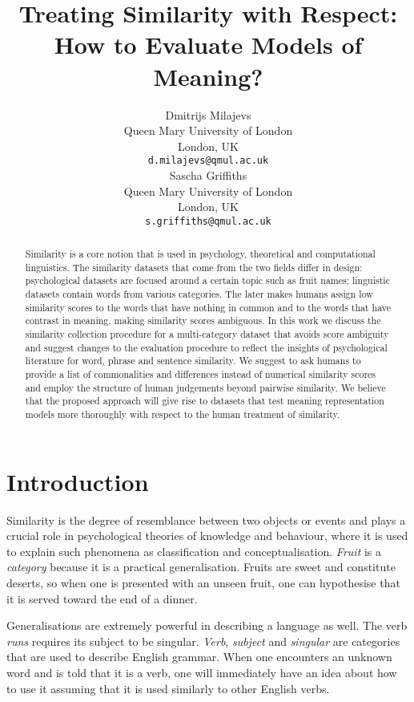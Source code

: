 \documentclass[11pt]{article}
\title{Treating Similarity with Respect: How to Evaluate Models of Meaning?}
\author{Dmitrijs Milajevs \\
  Queen Mary University of London \\
  London, UK \\
  {\tt d.milajevs@qmul.ac.uk} \\\And
  Sascha Griffiths \\
  Queen Mary University of London \\
  London, UK \\
  {\tt s.griffiths@qmul.ac.uk} \\
}
\date{}
\begin{document}
\maketitle

\begin{abstract}
Similarity is a core notion that is used in psychology, theoretical and computational linguistics. The similarity datasets that come from the two fields differ in design: psychological datasets are focused around a certain topic such as fruit names; linguistic datasets contain words from various categories. The later makes humans assign low similarity scores to the words that have nothing in common and to the words that have contrast in meaning, making similarity scores ambiguous. In this work we discuss the similarity collection procedure for a multi-category dataset that avoids score ambiguity and suggest changes to the evaluation procedure to reflect the insights of psychological literature for word, phrase and sentence similarity. We suggest to ask humans to provide a list of commonalities and differences instead of numerical similarity scores and employ the structure of human judgements beyond pairwise similarity. We believe that the proposed approach will give rise to datasets that test meaning representation models more thoroughly with respect to the human treatment of similarity.
\end{abstract}

\section{Introduction}
\label{sec:introduction}

Similarity is the degree of resemblance between two objects or events \cite{WCS:WCS1282} and plays a crucial role in psychological theories of knowledge and behaviour, where it is used to explain such phenomena as classification and conceptualisation. \textit{Fruit} is a \emph{category} because it is a practical generalisation. Fruits are sweet and constitute deserts, so when one is presented with an unseen fruit, one can hypothesise that it is served toward the end of a dinner.

Generalisations are extremely powerful in describing a language as well. The verb \textit{runs} requires its subject to be singular. \textit{Verb}, \textit{subject} and \textit{singular} are categories that are used to describe English grammar. When one encounters an unknown word and is told that it is a verb, one will immediately have an idea about how to use it assuming that it is used similarly to other English verbs.
\end{document}
